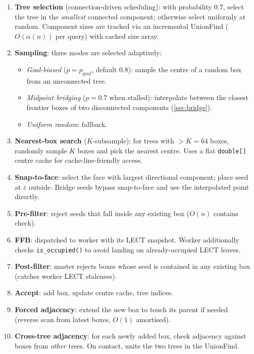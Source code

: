 \documentclass[journal]{IEEEtran}
\begin{document}
\begin{enumerate}[nosep]
  \item \textbf{Tree selection} (connection-driven scheduling):
    with probability 0.7, select the tree in the \emph{smallest}
    connected component; otherwise select uniformly at random.
    Component sizes are tracked via an incremental UnionFind
    ($O(\alpha(n))$ per query) with cached size array.

  \item \textbf{Sampling}: three modes are selected adaptively:
    \begin{itemize}[nosep]
      \item \emph{Goal-biased} ($p = p_\text{goal}$, default 0.8):
        sample the centre of a random box from an unconnected tree.
      \item \emph{Midpoint bridging} ($p = 0.7$ when stalled):
        interpolate between the closest frontier boxes of two
        disconnected components (\cref{sec:bridge}).
      \item \emph{Uniform random}: fallback.
    \end{itemize}

  \item \textbf{Nearest-box search} ($K$-subsample):
    for trees with $> K = 64$ boxes, randomly sample $K$ boxes and
    pick the nearest centre.  Uses a flat \texttt{double[]} centre
    cache for cache-line-friendly access.

  \item \textbf{Snap-to-face}: select the face with largest
    directional component; place seed at $\varepsilon$ outside.
    Bridge seeds bypass snap-to-face and use the interpolated
    point directly.

  \item \textbf{Pre-filter}: reject seeds that fall inside any
    existing box ($O(n)$ contains check).

  \item \textbf{FFB}: dispatched to worker with its LECT snapshot.
    Worker additionally checks \texttt{is\_occupied()} to avoid
    landing on already-occupied LECT leaves.

  \item \textbf{Post-filter}: master rejects boxes whose seed is
    contained in any existing box (catches worker LECT staleness).

  \item \textbf{Accept}: add box, update centre cache, tree indices.

  \item \textbf{Forced adjacency}: extend the new box to touch its
    parent if needed (reverse scan from latest boxes, $O(1)$ amortised).

  \item \textbf{Cross-tree adjacency}: for each newly added box,
    check adjacency against boxes from \emph{other} trees.
    On contact, unite the two trees in the UnionFind.
\end{enumerate}
\end{document}
